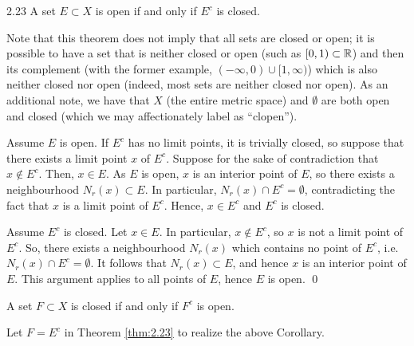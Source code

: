 \setcounter{rudin}{22}
\begin{theorem}{}{2.23}
    A set $E \subset X$ is open if and only if $E^c$ is closed.
\end{theorem}
\noindent Note that this theorem does not imply that all sets are closed or open; it is possible to have a set that is neither closed or open (such as $[0, 1) \subset \mathbb{R}$) and then its complement (with the former example, $(-\infty, 0) \cup [1, \infty)$) which is also neither closed nor open (indeed, most sets are neither closed nor open). As an additional note, we have that $X$ (the entire metric space) and $\emptyset$ are both open and closed (which we may affectionately label as ``clopen'').

\begin{nproof}
    \boxed{\implies} Assume $E$ is open. If $E^c$ has no limit points, it is trivially closed, so suppose that there exists a limit point $x$ of $E^c$. Suppose for the sake of contradiction that $x \notin E^c$. Then, $x \in E$. As $E$ is open, $x$ is an interior point of $E$, so there exists a neighbourhood $N_r(x) \subset E$. In particular, $N_r(x) \cap E^c = \emptyset$, contradicting the fact that $x$ is a limit point of $E^c$. Hence, $x \in E^c$ and $E^c$ is closed.

    \boxed{\impliedby} Assume $E^c$ is closed. Let $x \in E$. In particular, $x \notin E^c$, so $x$ is not a limit point of $E^c$. So, there exists a neighbourhood $N_r(x)$ which contains no point of $E^c$, i.e. $N_r(x) \cap E^c = \emptyset$. It follows that $N_r(x) \subset E$, and hence $x$ is an interior point of $E$. This argument applies to all points of $E$, hence $E$ is open. \qed
\end{nproof}

\begin{ncorollary}{}{}
    A set $F \subset X$ is closed if and only if $F^c$ is open.
\end{ncorollary}
\noindent Let $F = E^c$ in Theorem \ref{thm:2.23} to realize the above Corollary.

